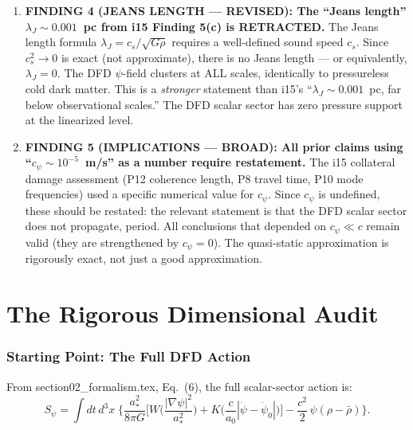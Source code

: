 \documentclass[11pt]{article}
\begin{document}
\begin{tcolorbox}[colback=blue!5!white, colframe=blue!60!black,
  title=\textbf{W4i16 TOP 5 FINDINGS --- Ranked by Programme Impact}]
\begin{enumerate}
\item \textbf{FINDING 4 (JEANS LENGTH --- REVISED): The ``Jeans length''
  $\lambda_J \sim 0.001$~pc from i15 Finding 5(c) is RETRACTED.}
  The Jeans length formula $\lambda_J = c_s/\sqrt{G\rho}$ requires
  a well-defined sound speed $c_s$. Since $c_s^2 \to 0$ is exact
  (not approximate), there is no Jeans length --- or equivalently,
  $\lambda_J = 0$. The DFD $\psi$-field clusters at ALL scales,
  identically to pressureless cold dark matter. This is a
  \emph{stronger} statement than i15's ``$\lambda_J \sim 0.001$~pc,
  far below observational scales.'' The DFD scalar sector has
  zero pressure support at the linearized level.

\item \textbf{FINDING 5 (IMPLICATIONS --- BROAD): All prior claims using
  ``$c_\psi \sim 10^{-5}$~m/s'' as a number require restatement.}
  The i15 collateral damage assessment (P12 coherence length, P8 travel
  time, P10 mode frequencies) used a specific numerical value for $c_\psi$.
  Since $c_\psi$ is undefined, these should be restated: the relevant
  statement is that the DFD scalar sector does not propagate, period.
  All conclusions that depended on $c_\psi \ll c$ remain valid
  (they are strengthened by $c_\psi = 0$). The quasi-static
  approximation is rigorously exact, not just a good approximation.

\end{enumerate}
\end{tcolorbox}

\newpage

\part{The Rigorous Dimensional Audit}
\label{part:audit}

\section{Starting Point: The Full DFD Action}

From section02\_formalism.tex, Eq.~(6), the full scalar-sector action is:
\begin{equation}
S_\psi = \int dt\,d^3x\;\Biggl\{
  \frac{a_*^2}{8\pi G}\biggl[
    W\!\biggl(\frac{|\nabla\psi|^2}{a_*^2}\biggr)
    + K\!\biggl(\frac{c}{a_0}|\dot\psi{-}\dot\psi_0|\biggr)
  \biggr]
  - \frac{c^2}{2}\,\psi(\rho - \bar\rho)
\Biggr\}.
\label{eq:full-action}
\end{equation}
\end{document}
